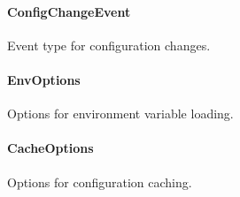 \hypertarget{configchangeevent}{%
\paragraph{ConfigChangeEvent}\label{configchangeevent}}

Event type for configuration changes.

\begin{Shaded}
\begin{Highlighting}[]
\OperatorTok{\textless{}}\OperatorTok{\textgreater{}} \OperatorTok{=}\NormalTok{ \{}
\OperatorTok{:}\OperatorTok{;}
\OperatorTok{:}\OperatorTok{;}
\OperatorTok{:} \OperatorTok{;}
\OperatorTok{:} \OperatorTok{;}
\NormalTok{\}}\OperatorTok{;}
\end{Highlighting}
\end{Shaded}

\hypertarget{envoptions}{%
\paragraph{EnvOptions}\label{envoptions}}

Options for environment variable loading.

\begin{Shaded}
\begin{Highlighting}[]
 \OperatorTok{;}
 \OperatorTok{;}
 \NormalTok{[]}\OperatorTok{;}
 \OperatorTok{;}
 \OperatorTok{;}
 \OperatorTok{;}
\NormalTok{\}}
\end{Highlighting}
\end{Shaded}

\hypertarget{cacheoptions}{%
\paragraph{CacheOptions}\label{cacheoptions}}

Options for configuration caching.

